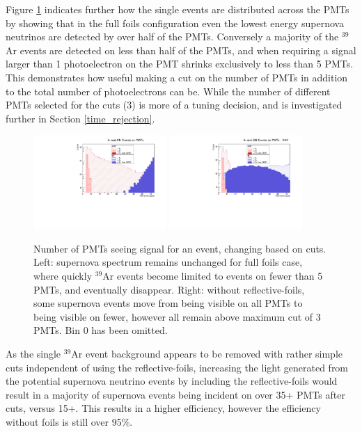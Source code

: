 \documentclass[a4paper]{article}
\begin{document}
Figure \ref{num_pmts} indicates further how the single events are distributed across the PMTs by showing that in the full foils configuration even the lowest energy supernova neutrinos are detected by over half of the PMTs. Conversely a majority of the $^{39}$Ar events are detected on less than half of the PMTs, and when requiring a signal larger than 1 photoelectron on the PMT shrinks exclusively to less than 5 PMTs. This demonstrates how useful making a cut on the number of PMTs in addition to the total number of photoelectrons can be. While the number of different PMTs selected for the cuts (3) is more of a tuning decision, and is investigated further in Section \ref{time_rejection}.

\begin{figure}[H]
\center
\includegraphics[width=0.45\textwidth]{num_pmts_uniform.pdf}
\includegraphics[width=0.45\textwidth]{num_pmts_vuv_only_uniform_adjusted_cuts.pdf}
\caption{Number of PMTs seeing signal for an event, changing based on cuts. Left: supernova spectrum remains unchanged for full foils case, where quickly $^{39}$Ar events become limited to events on fewer than 5 PMTs, and eventually disappear. Right: without reflective-foils, some supernova events move from being visible on all PMTs to being visible on fewer, however all remain above maximum cut of 3 PMTs. Bin 0 has been omitted.}\label{num_pmts}
\end{figure}

As the single $^{39}$Ar event background appears to be removed with rather simple cuts independent of using the reflective-foils, increasing the light generated from the potential supernova neutrino events by including the reflective-foils would result in a majority of supernova events being incident on over 35+ PMTs after cuts, versus 15+. This results in a higher efficiency, however the efficiency without foils is still over 95\%.
\end{document}

